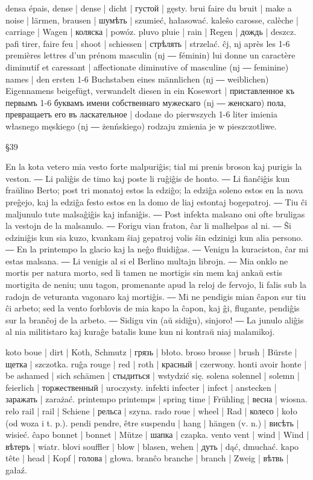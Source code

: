 densa épais, dense | dense | dicht | густой | gęsty.
brui faire du bruit | make a noise | lärmen, brausen | шумѣть | szumieć, hałasować.
kaleŝo carosse, calèche | carriage | Wagen | коляска | powóz.
pluvo pluie | rain | Regen | дождь | deszcz.
pafi tirer, faire feu | shoot | schiessen | стрѣлять | strzelać.
ĉj, nj après les 1-6 premières lettres d’un prénom masculin (nj ― féminin) lui donne un caractère diminutif et caressant | affectionate diminutive of masculine (nj ― feminine) names | den ersten 1-6 Buchstaben eines männlichen (nj ― weiblichen) Eigennamens beigefügt, verwandelt diesen in ein Kosewort | приставленное къ первымъ 1-6 буквамъ имени собственнаго мужескаго (nj ― женскаго) пола, превращаетъ его въ ласкательное | dodane do pierwszych 1-6 liter imienia własnego męskiego (nj ― żenńskiego) rodzaju zmienia je w pieszczotliwe.

§39

En la kota vetero mia vesto forte malpuriĝis; tial mi prenis broson kaj purigis la veston. ― Li paliĝis de timo kaj poste li ruĝiĝis de honto. ― Li fianĉiĝis kun fraŭlino Berto; post tri monatoj estos la edziĝo; la edziĝa soleno estos en la nova preĝejo, kaj la edziĝa festo estos en la domo de liaj estontaj bogepatroj. ― Tiu ĉi maljunulo tute malsaĝiĝis kaj infaniĝis. ― Post infekta malsano oni ofte bruligas la vestojn de la malsanulo. ― Forigu vian fraton, ĉar li malhelpas al ni. ― Ŝi edziniĝis kun sia kuzo, kvankam ŝiaj gepatroj volis ŝin edzinigi kun alia persono. ― En la printempo la glacio kaj la neĝo fluidiĝas. ― Venigu la kuraciston, ĉar mi estas malsana. ― Li venigis al si el Berlino multajn librojn. ― Mia onklo ne mortis per natura morto, sed li tamen ne mortigis sin mem kaj ankaŭ estis mortigita de neniu; unu tagon, promenante apud la reloj de fervojo, li falis sub la radojn de veturanta vagonaro kaj mortiĝis. ― Mi ne pendigis mian ĉapon sur tiu ĉi arbeto; sed la vento forblovis de mia kapo la ĉapon, kaj ĝi, flugante, pendiĝis sur la branĉoj de la arbeto. ― Sidigu vin (aŭ sidiĝu), sinjoro! ― La junulo aliĝis al nia militistaro kaj kuraĝe batalis kune kun ni kontraŭ niaj malamikoj.

koto boue | dirt | Koth, Schmutz | грязь | błoto.
broso brosse | brush | Bürste | щетка | szczotka.
ruĝa rouge | red | roth | красный | czerwony.
honti avoir honte | be ashamed | sich schämen | стыдиться | wstydzić się.
solena solennel | solemn | feierlich | торжественный | uroczysty.
infekti infecter | infect | anstecken | заражать | zarażać.
printempo printemps | spring time | Frühling | весна | wiosna.
relo rail | rail | Schiene | рельса | szyna.
rado roue | wheel | Rad | колесо | koło (od woza i t. p.).
pendi pendre, être suspendu | hang | hängen (v. n.) | висѣть | wisieć.
ĉapo bonnet | bonnet | Mütze | шапка | czapka.
vento vent | wind | Wind | вѣтеръ | wiatr.
blovi souffler | blow | blasen, wehen | дуть | dąć, dmuchać.
kapo tête | head | Kopf | голова | głowa.
branĉo branche | branch | Zweig | вѣтвь | gałaź.

